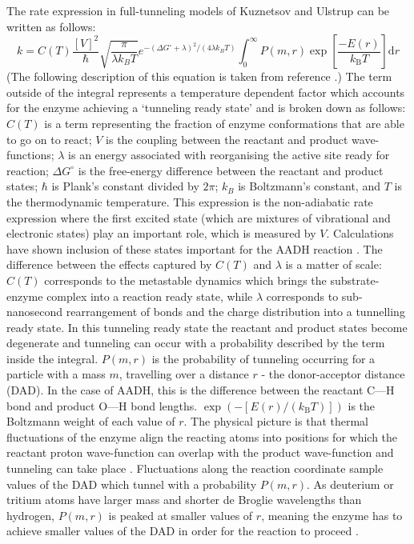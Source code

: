 The rate expression in full-tunneling models of Kuznetsov and Ulstrup \cite{kuznetsovProtonHydrogenAtom1999a, knappTemperatureDependentIsotopeEffects2002, kohenRoleDynamicsEnzyme2015} can be written as follows: 
\begin{equation}\label{eqn:full_tunnel}
k = C(T)\frac{[V]^{2}}{\hbar} \sqrt{\frac{\pi}{\lambda k_{B}T}} e^{-(\Delta G^{\circ} + \lambda)^{2}/(4\lambda k_{B}T)} \int_{0}^{\infty} P(m,r) \exp \left[\frac{-E(r) }{k_{\mathrm{B}} T}\right] \mathrm{d}r
\end{equation}
(The following description of this equation is taken from reference \cite{klinmanHydrogenTunnelingLinks2013}.) The term outside of the integral represents a temperature dependent factor which accounts for the enzyme achieving a `tunneling ready state' and is broken down as follows: $C(T)$ is a term representing the fraction of enzyme conformations that are able to go on to react; $V$ is the coupling between the reactant and product wave-functions;  $\lambda$ is an energy associated with reorganising the active site ready for reaction; $\Delta G^{\circ}$ is  the free-energy difference between the reactant and product states; $\hbar$ is Plank's constant divided by $2\pi$; $k_{B}$ is Boltzmann's constant, and $T$ is the thermodynamic temperature. This expression is the non-adiabatic rate expression where the first excited state (which are mixtures of vibrational and electronic states) play an important role, which is measured by $V$. Calculations have shown inclusion of these states important for the AADH reaction \cite{johannissenProtonTunnelingAromatic2007}.   The difference between the effects captured by $C(T)$ and $\lambda$ is a matter of scale: $C(T)$ corresponds to the metastable dynamics which brings the substrate-enzyme complex into a reaction ready state, while $\lambda$ corresponds to sub-nanosecond rearrangement of bonds and the charge distribution into a tunnelling ready state. In this tunneling ready state the reactant and product states become degenerate and tunneling can occur with a probability described by the term inside the integral.  $P(m, r)$ is the probability of tunneling occurring for a particle with a mass $m$, travelling over a distance $r$ - the donor-acceptor distance (DAD). In the case of AADH, this is the difference between the reactant C---H bond and product O---H bond lengths.   $\exp{\left(-\left[E(r) /\left(k_{\mathrm{B}} T\right)\right]\right)}$ is the Boltzmann weight of each value of $r$. The physical picture is that thermal fluctuations of the enzyme align the reacting atoms into positions for which the reactant proton wave-function can overlap with the product wave-function and tunneling can take place \cite{klinmanHydrogenTunnelingLinks2013, kohenRoleDynamicsEnzyme2015}. Fluctuations along the reaction coordinate sample values of the DAD which tunnel with a probability $P(m,r)$. As deuterium or tritium atoms have larger mass and shorter de Broglie wavelengths than hydrogen,  $P(m,r)$ is peaked at smaller values of $r$, meaning the enzyme has to achieve smaller values of the DAD in order for the reaction to proceed \cite{klinmanHydrogenTunnelingLinks2013, kohenRoleDynamicsEnzyme2015}. 

